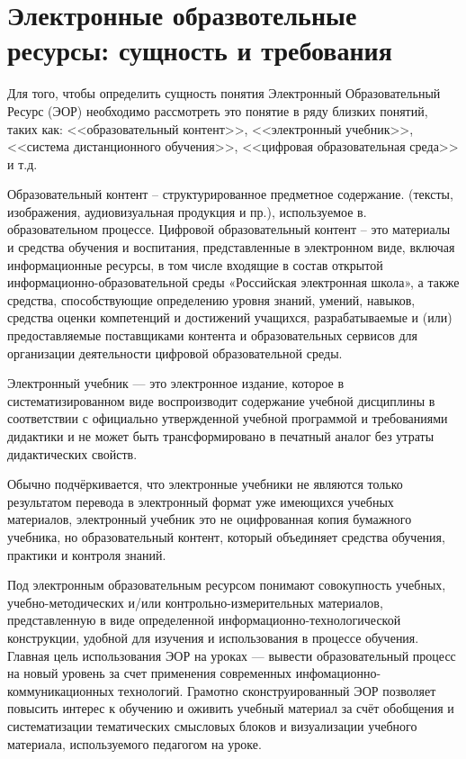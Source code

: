 \newpage
\large
\section {Электронные образвотельные ресурсы: сущность и требования}
\label{section1}
Для того, чтобы определить сущность понятия Электронный Образовательный Ресурс (ЭОР) необходимо рассмотреть это понятие в ряду близких понятий, таких как: <<образовательный контент>>, <<электронный учебник>>, <<система дистанционного обучения>>, <<цифровая образовательная среда>> и т.д.

Образовательный контент – структурированное предметное содержание. (тексты, изображения, аудиовизуальная продукция и пр.), используемое в. образовательном процессе. 
Цифровой образовательный контент – это материалы и средства обучения и воспитания, представленные в электронном виде, включая информационные ресурсы, в том числе входящие в состав открытой информационно-образовательной среды «Российская электронная школа», а также средства, способствующие определению уровня знаний, умений, навыков, средства оценки компетенций и достижений учащихся, разрабатываемые и (или) предоставляемые поставщиками контента и образовательных сервисов для организации деятельности цифровой образовательной среды.

Электронный учебник --- это электронное издание, которое в систематизированном виде
воспроизводит содержание учебной дисциплины в соответствии с официально утвержденной учебной программой и требованиями дидактики и не может быть трансформировано в печатный аналог без утраты дидактических свойств\cite{balalaeva}. 

Обычно подчёркивается, что электронные учебники не являются
только результатом перевода в электронный формат уже имеющихся учебных
материалов, электронный учебник это не оцифрованная копия бумажного учебника, но образовательный контент, который объединяет средства обучения, практики и контроля знаний\cite[c.53]{blinov}.

Под электронным образовательным ресурсом понимают совокупность учебных, учебно-методических и/или контрольно-измерительных материалов, представленную в виде определенной информационно-технологической конструкции, удобной для изучения и
использования в процессе обучения\cite{jurkina20}. Главная цель использования ЭОР на уроках --- вывести образовательный процесс на новый уровень за счет применения современных инфомационно-коммуникационных технологий. Грамотно сконструированный ЭОР позволяет повысить интерес к обучению и оживить учебный материал за счёт обобщения и систематизации тематических смысловых блоков и визуализации учебного материала, используемого педагогом на уроке.


